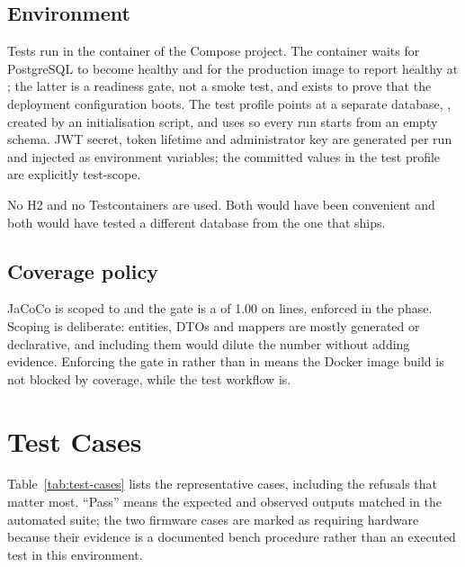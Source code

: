 \subsection*{Environment}

Tests run in the  container of the Compose project. The container waits
for PostgreSQL to become healthy and for the production image to report healthy at
; the latter is a readiness gate, not a smoke test, and exists
to prove that the deployment configuration boots. The test profile points at a
separate database, , created by an initialisation script, and uses
 so every run starts from an empty schema. JWT secret, token
lifetime and administrator key are generated per run and injected as environment
variables; the committed values in the test profile are explicitly test-scope.

No H2 and no Testcontainers are used. Both would have been convenient and both would
have tested a different database from the one that ships.


\subsection*{Coverage policy}

JaCoCo is scoped to  and the gate is a
 of 1.00 on lines, enforced in the  phase. Scoping is
deliberate: entities, DTOs and mappers are mostly generated or declarative, and
including them would dilute the number without adding evidence. Enforcing the gate in
 rather than in  means the Docker image build is not
blocked by coverage, while the test workflow is.

\section{Test Cases}

Table~\ref{tab:test-cases} lists the representative cases, including the refusals
that matter most. ``Pass'' means the expected and observed outputs matched in the
automated suite; the two firmware cases are marked as requiring hardware because
their evidence is a documented bench procedure rather than an executed test in this
environment.

